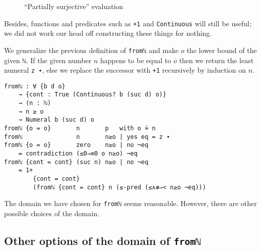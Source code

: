 \documentclass[\main/thesis.tex]{subfiles}
\begin{document}
\begin{figure}[H]
    \centering
    \begin{adjustbox}{max width=\textwidth}
    \end{adjustbox}
\caption{``Partially surjective'' evaluation}
\label{figure:34}
\end{figure}


Besides, functions and predicates such as \lstinline|+1| and
\lstinline|Continuous| will still be useful;
we did not work our head off constructing these things for nothing.

We generalize the previous definition of \lstinline|fromℕ| and make $ o $ the
lower bound of the given \lstinline|ℕ|.
If the given number $ n $ happens to be equal to $ o $ then we return the least
numeral \lstinline|z ∙|, else we replace the successor with \lstinline|+1|
recursively by induction on $ n $.

\begin{lstlisting}
fromℕ : ∀ {b d o}
    → {cont : True (Continuous? b (suc d) o)}
    → (n : ℕ)
    → n ≥ o
    → Numeral b (suc d) o
fromℕ {o = o}       n       p   with o ≟ n
fromℕ               n       n≥o | yes eq = z ∙
fromℕ {o = o}       zero    n≥o | no ¬eq
    = contradiction (≤0⇒≡0 o n≥o) ¬eq
fromℕ {cont = cont} (suc n) n≥o | no ¬eq
    = 1+
        {cont = cont}
        (fromℕ {cont = cont} n (≤-pred (≤∧≢⇒< n≥o ¬eq)))
\end{lstlisting}

The domain we have chosen for \lstinline|fromℕ| seems reasonable.
However, there are other possible choices of the domain.

\subsection{Other options of the domain of \lstinline|fromℕ|}
\end{document}
